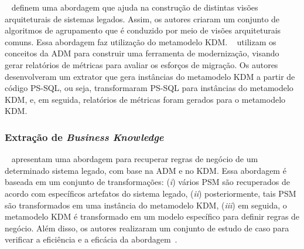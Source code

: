  
 
 
~ definem uma abordagem que ajuda na construção de distintas visões arquiteturais de sistemas legados. Assim, os autores criaram um conjunto de algoritmos de agrupamento que é conduzido por meio de visões arquiteturais comuns. Essa abordagem faz
utilização do metamodelo KDM. ~ utilizam os conceitos da ADM para construir uma ferramenta de modernização, visando gerar relatórios de métricas para avaliar os esforços de migração. Os autores desenvolveram um extrator que gera instâncias do metamodelo KDM a partir de código PS-SQL, ou seja, transformaram PS-SQL para instâncias do metamodelo KDM, e, em seguida, relatórios de métricas foram gerados para o metamodelo KDM.

 

\subsubsection{Extração de \textit{Business Knowledge}}
\label{ssub:Business_Knowledge_Extraction}

~ apresentam uma abordagem para recuperar regras de negócio de um determinado sistema legado, com base na ADM e no KDM. Essa abordagem é baseada em um conjunto de transformações: (\textit{i}) vários PSM são recuperados de acordo com específicos artefatos do sistema legado, (\textit{ii}) posteriormente, tais PSM são transformados em uma instância do metamodelo KDM, (\textit{iii}) em seguida, o metamodelo KDM é transformado em um modelo específico para definir regras de negócio. Além disso, os autores realizaram um conjunto de estudo de caso para verificar a eficiência e a eficácia da abordagem~\cite{PerezCastillo20121370}.

